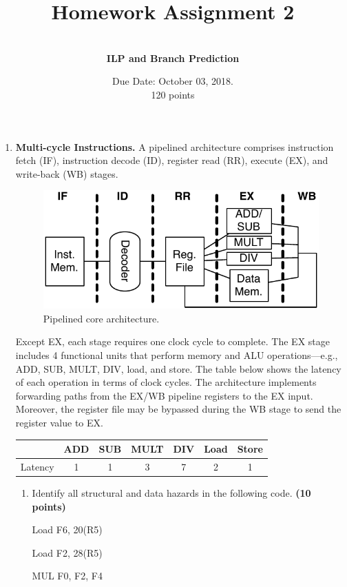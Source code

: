 \documentclass[a4paper, 11pt]{exam}
\title{Homework Assignment 2}
\subtitle{CS/ECE 6810: Computer Architecture \\
September 26,2018
\\
Name: Jake Pitkin

UID: u0891770 }
\author{ \\
\textbf{ILP and Branch Prediction}}
\date{Due Date: October 03, 2018.\\
120 points}
\begin{document}
\maketitle

\begin{enumerate}
	
\item \textbf{Multi-cycle Instructions.}
A pipelined architecture comprises instruction fetch (IF), instruction decode (ID), register read (RR), execute (EX), and write-back (WB) stages.
\begin{figure}[!h]
	\centering
	\includegraphics[width=0.5\linewidth]{q1}
	\caption{Pipelined core architecture.}
	\label{fig:q1}
\end{figure}

Except EX, each stage requires one clock cycle to complete.
The EX stage includes 4 functional units that perform memory and ALU operations---e.g., ADD, SUB, MULT, DIV, load, and store.
The table below shows the latency of each operation in terms of clock cycles.
The architecture implements forwarding paths from the EX/WB pipeline registers to the EX input.
Moreover, the register file may be bypassed during the WB stage to send the register value to EX.

\begin{center}
\begin{tabular}{ |c|c|c|c|c|c|c| } 
 \hline
  & ADD & SUB & MULT & DIV & Load & Store \\ 
  \hline
 Latency & 1 & 1 & 3 & 7 & 2 & 1 \\ 
 \hline
\end{tabular}
\end{center}

\begin{enumerate}
\item Identify all structural and data hazards in the following code. \textbf {(10 points)}


\begin {center}
Load F6, 20(R5) 

Load F2, 28(R5)

MUL F0, F2, F4


\end{center}
\end{enumerate}
\end{enumerate}
\end{document}

